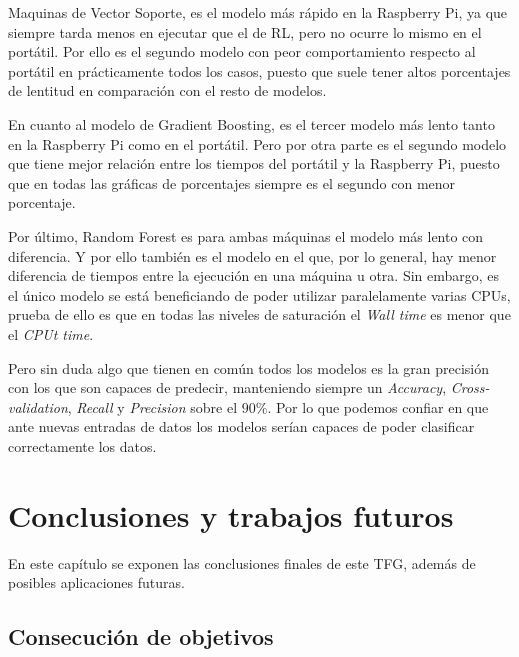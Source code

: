 \documentclass[a4paper, 12pt]{book}
\begin{document}
Maquinas de Vector Soporte, es el modelo más rápido en la Raspberry Pi, ya que siempre tarda menos en ejecutar que el de RL, pero no ocurre lo mismo en el portátil. Por ello es el segundo modelo con peor comportamiento respecto al portátil en prácticamente todos los casos, puesto que suele tener altos porcentajes de lentitud en comparación con el resto de modelos.

En cuanto al modelo de Gradient Boosting, es el tercer modelo más lento tanto en la Raspberry Pi como en el portátil. Pero por otra parte es el segundo modelo que tiene mejor relación entre los tiempos del portátil y la Raspberry Pi, puesto que en todas las gráficas de porcentajes siempre es el segundo con menor porcentaje.

Por último, Random Forest es para ambas máquinas el modelo más lento con diferencia. Y por ello también es el modelo en el que, por lo general, hay menor diferencia de tiempos entre la ejecución en una máquina u otra. Sin embargo, es el único modelo se está beneficiando de poder utilizar paralelamente varias CPUs, prueba de ello es que en todas las niveles de saturación el \textit{Wall time} es menor que el \textit{CPUt time}.

Pero sin duda algo que tienen en común todos los modelos es la gran precisión con los que son capaces de predecir, manteniendo siempre un \textit{Accuracy}, \textit{Cross-validation}, \textit{Recall} y \textit{Precision} sobre el $90\%$. Por lo que podemos confiar en que ante nuevas entradas de datos los modelos serían capaces de poder clasificar correctamente los datos.
 
\cleardoublepage



\chapter{Conclusiones y trabajos futuros}
\label{chap:conclusiones}

En este capítulo se exponen las conclusiones finales de este TFG, además de posibles aplicaciones futuras.

\section{Consecución de objetivos}
\label{sec:consecucion-objetivos}
\end{document}
